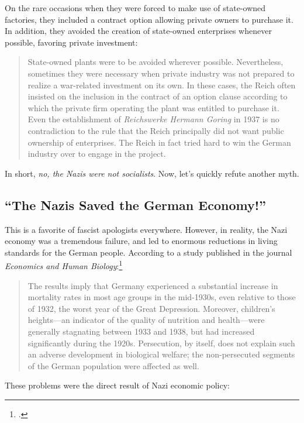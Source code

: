 On the rare occasions when they were forced to make use of state-owned factories, they included a contract option allowing private owners to purchase it.
In addition, they avoided the creation of state-owned enterprises whenever possible, favoring private investment:

\begin{quote}
    State-owned plants were to be avoided wherever possible.
    Nevertheless, sometimes they were necessary when private industry was not prepared to realize a war-related investment on its own.
    In these cases, the Reich often insisted on the inclusion in the contract of an option clause according to which the private firm operating the plant was entitled to purchase it.
    Even the establishment of \textit{Reichswerke Hermann Goring} in 1937 is no contradiction to the rule that the Reich principally did not want public ownership of enterprises.
    The Reich in fact tried hard to win the German industry over to engage in the project.
\end{quote}

In short, \emph{no, the Nazis were not socialists}.
Now, let's quickly refute another myth.

\subsection*{``The Nazis Saved the German Economy!''}

This is a favorite of fascist apologists everywhere.
However, in reality, the Nazi economy was a tremendous failure, and led to enormous reductions in living standards for the German people.
According to a study published in the journal \textit{Economics and Human Biology}:\footcite{autarchy}

\begin{quote}
    The results imply that Germany experienced a substantial increase in mortality rates in most age groups in the mid-1930s, even relative to those of 1932, the worst year of the Great Depression.
    Moreover, children’s heights---an indicator of the quality of nutrition and health---were generally stagnating between 1933 and 1938, but had increased significantly during the 1920s.
    Persecution, by itself, does not explain such an adverse development in biological welfare; the non-persecuted segments of the German population were affected as well.
\end{quote}

These problems were the direct result of Nazi economic policy:

